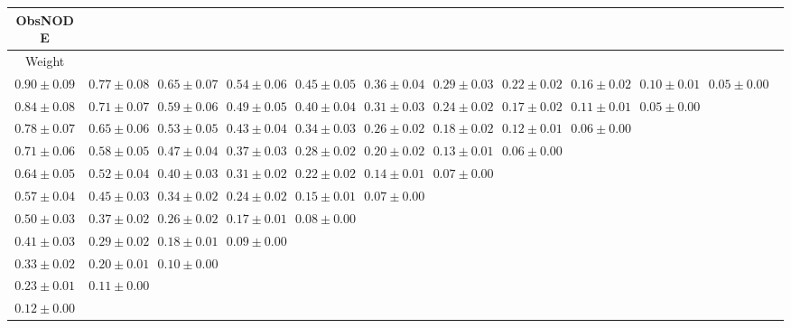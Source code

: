 \begin{table}[ht]
\centering
{\tiny
{
\begin{adjustbox}{width=\textwidth}
\begin{tabular}{cccccccccccc}
\hline
ObsNODE &  &  &  &  &  &  &  &  &  & \\
\hline
Weight &  &  &  &  &  &  &  &  &  & \\
\hline
$0.90 \pm 0.09$ & $0.77 \pm 0.08$ & $0.65 \pm 0.07$ & $0.54 \pm 0.06$ & $0.45 \pm 0.05$ & $0.36 \pm 0.04$ & $0.29 \pm 0.03$ & $0.22 \pm 0.02$ & $0.16 \pm 0.02$ & $0.10 \pm 0.01$ & $0.05 \pm 0.00$ &  \\
$0.84 \pm 0.08$ & $0.71 \pm 0.07$ & $0.59 \pm 0.06$ & $0.49 \pm 0.05$ & $0.40 \pm 0.04$ & $0.31 \pm 0.03$ & $0.24 \pm 0.02$ & $0.17 \pm 0.02$ & $0.11 \pm 0.01$ & $0.05 \pm 0.00$ &  &  \\
$0.78 \pm 0.07$ & $0.65 \pm 0.06$ & $0.53 \pm 0.05$ & $0.43 \pm 0.04$ & $0.34 \pm 0.03$ & $0.26 \pm 0.02$ & $0.18 \pm 0.02$ & $0.12 \pm 0.01$ & $0.06 \pm 0.00$ &  &  &  \\
$0.71 \pm 0.06$ & $0.58 \pm 0.05$ & $0.47 \pm 0.04$ & $0.37 \pm 0.03$ & $0.28 \pm 0.02$ & $0.20 \pm 0.02$ & $0.13 \pm 0.01$ & $0.06 \pm 0.00$ &  &  &  &  \\
$0.64 \pm 0.05$ & $0.52 \pm 0.04$ & $0.40 \pm 0.03$ & $0.31 \pm 0.02$ & $0.22 \pm 0.02$ & $0.14 \pm 0.01$ & $0.07 \pm 0.00$ &  &  &  &  &  \\
$0.57 \pm 0.04$ & $0.45 \pm 0.03$ & $0.34 \pm 0.02$ & $0.24 \pm 0.02$ & $0.15 \pm 0.01$ & $0.07 \pm 0.00$ &  &  &  &  &  &  \\
$0.50 \pm 0.03$ & $0.37 \pm 0.02$ & $0.26 \pm 0.02$ & $0.17 \pm 0.01$ & $0.08 \pm 0.00$ &  &  &  &  &  &  &  \\
$0.41 \pm 0.03$ & $0.29 \pm 0.02$ & $0.18 \pm 0.01$ & $0.09 \pm 0.00$ &  &  &  &  &  &  &  &  \\
$0.33 \pm 0.02$ & $0.20 \pm 0.01$ & $0.10 \pm 0.00$ &  &  &  &  &  &  &  &  &  \\
$0.23 \pm 0.01$ & $0.11 \pm 0.00$ &  &  &  &  &  &  &  &  &  &  \\
$0.12 \pm 0.00$ &  &  &  &  &  &  &  &  &  &  &  \\



\end{tabular}
\end{adjustbox}}}
\end{table}
